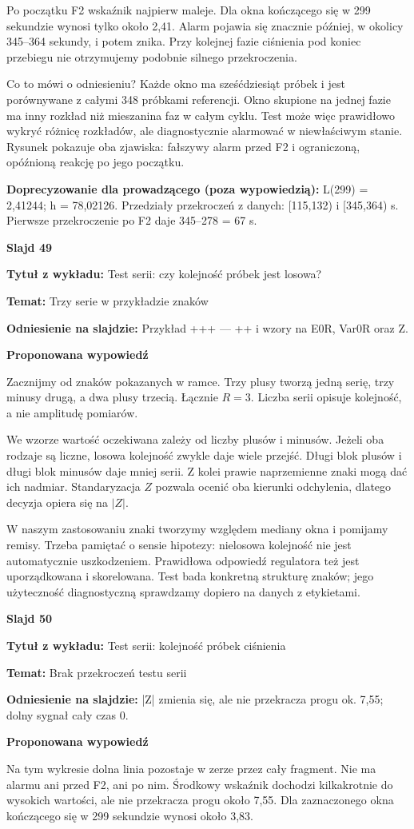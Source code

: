 \documentclass[a4paper,11pt]{article}
\newcommand{\NumerSlajdu}{1}
\newcommand{\Komentarz}[3]{%
  \gdef\NumerSlajdu{#1}%
  {\Large\bfseries Slajd #1\par}\smallskip
  \textbf{Tytuł z wykładu:} #2\par
  \textbf{Temat:} #3\par\medskip
}
\begin{document}
Po początku F2 wskaźnik najpierw maleje. Dla okna kończącego się w 299 sekundzie wynosi tylko około 2,41. Alarm pojawia się znacznie później, w okolicy 345–364 sekundy, i potem znika. Przy kolejnej fazie ciśnienia pod koniec przebiegu nie otrzymujemy podobnie silnego przekroczenia.

Co to mówi o odniesieniu? Każde okno ma sześćdziesiąt próbek i jest porównywane z całymi 348 próbkami referencji. Okno skupione na jednej fazie ma inny rozkład niż mieszanina faz w całym cyklu. Test może więc prawidłowo wykryć różnicę rozkładów, ale diagnostycznie alarmować w niewłaściwym stanie. Rysunek pokazuje oba zjawiska: fałszywy alarm przed F2 i ograniczoną, opóźnioną reakcję po jego początku.

{\small\color{black!65}\textbf{Doprecyzowanie dla prowadzącego (poza wypowiedzią):} L(299) = 2,41244; h = 78,02126. Przedziały przekroczeń z danych: [115,132) i [345,364) s. Pierwsze przekroczenie po F2 daje 345--278 = 67 s.\par}
\clearpage

\Komentarz{49}{Test serii: czy kolejność próbek jest losowa?}{Trzy serie w przykładzie znaków}
{\small\color{black!65}\textbf{Odniesienie na slajdzie:} Przykład +++ --- ++ i wzory na E0R, Var0R oraz Z.\par}
\medskip
\textbf{Proponowana wypowiedź}\par
Zacznijmy od znaków pokazanych w ramce. Trzy plusy tworzą jedną serię, trzy minusy drugą, a dwa plusy trzecią. Łącznie $R=3$. Liczba serii opisuje kolejność, a nie amplitudę pomiarów.

We wzorze wartość oczekiwana zależy od liczby plusów i minusów. Jeżeli oba rodzaje są liczne, losowa kolejność zwykle daje wiele przejść. Długi blok plusów i długi blok minusów daje mniej serii. Z kolei prawie naprzemienne znaki mogą dać ich nadmiar. Standaryzacja $Z$ pozwala ocenić oba kierunki odchylenia, dlatego decyzja opiera się na $|Z|$.

W naszym zastosowaniu znaki tworzymy względem mediany okna i pomijamy remisy. Trzeba pamiętać o sensie hipotezy: nielosowa kolejność nie jest automatycznie uszkodzeniem. Prawidłowa odpowiedź regulatora też jest uporządkowana i skorelowana. Test bada konkretną strukturę znaków; jego użyteczność diagnostyczną sprawdzamy dopiero na danych z etykietami.
\clearpage

\Komentarz{50}{Test serii: kolejność próbek ciśnienia}{Brak przekroczeń testu serii}
{\small\color{black!65}\textbf{Odniesienie na slajdzie:} |Z| zmienia się, ale nie przekracza progu ok. 7,55; dolny sygnał cały czas 0.\par}
\medskip
\textbf{Proponowana wypowiedź}\par
Na tym wykresie dolna linia pozostaje w zerze przez cały fragment. Nie ma alarmu ani przed F2, ani po nim. Środkowy wskaźnik dochodzi kilkakrotnie do wysokich wartości, ale nie przekracza progu około 7,55. Dla zaznaczonego okna kończącego się w 299 sekundzie wynosi około 3,83.
\end{document}
